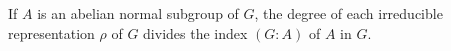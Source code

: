 If $A$ is an abelian normal subgroup of $G$, the degree of each irreducible representation $\rho$ of $G$ divides the index $(G : A)$ of $A$ in $G$.
